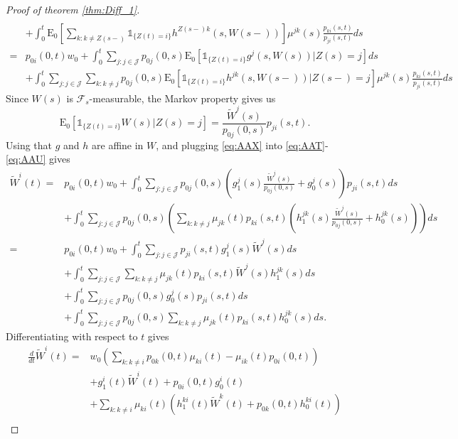 \documentclass[12pt]{article}
\newcommand{\E}{\text{E}}
\newcommand{\indic}[1]{\mathds{1}_{ \{ #1 \} }}
\theoremstyle{my_thm}
\begin{document}
\begin{proof}[Proof of theorem \ref{thm:Diff_1}]
\begin{align}
\\
&+
\nonumber \int_0^t \E_0 \left[ \sum_{k:k \neq Z(s-)}  \indic{Z(t)=i} h^{Z(s-)k}(s,W(s-))\right] \mu^{jk}(s) \frac{p_{ki}(s,t)}{p_{ji}(s,t)}  ds
\\
=&
p_{0i}(0,t)w_0+
 \int_0^t \sum_{j:j \in \mathcal{J}} p_{0j}(0,s) \E_0 \left[ \indic{Z(t)=i} g^{j}(s,W(s))|Z(s)=j \right] ds \label{eq:AAT}
\\
&+
 \int_0^t  \sum_{j:j \in \mathcal{J}}  \sum_{k:k \neq j} p_{0j}(0,s) \E_0 \left[ \indic{Z(t)=i} h^{jk}(s,W(s-)) | Z(s-)=j \right] \mu^{jk}(s) \frac{p_{ki}(s,t)}{p_{ji}(s,t)}   ds \label{eq:AAU}
\end{align}
Since $W(s)$ is $\mathcal{F}_s$-measurable, the Markov property gives us
\begin{equation}
\E_0[\indic{Z(t)=i}W(s)|Z(s)=j]=\frac{\tilde{W}^j(s)}{p_{0j}(0,s)}p_{ji}(s,t). \label{eq:AAX}
\end{equation}
Using that $g$ and $h$ are affine in $W$, and plugging \eqref{eq:AAX} into \eqref{eq:AAT}-\eqref{eq:AAU} gives
\begin{align*}
\tilde{W}^i(t)=&p_{0i}(0,t)w_0+
\int_0^t \sum_{j:j \in \mathcal{J}} p_{0j}(0,s)\left(  g_1^j(s)\frac{\tilde{W}^j(s)}{p_{0j}(0,s)}+g^j_0(s)\right)p_{ji}(s,t) ds
\\
&+
\int_0^t \sum_{j:j \in \mathcal{J}} p_{0j}(0,s)  \left( \sum_{k:k \neq j}  \mu_{jk}(t)p_{ki}(s,t) \left(  h_1^{jk}(s) \frac{\tilde{W}^j(s)}{p_{0j}(0,s)} +h_0^{jk}(s)  \right) \right) ds
 \\
=&p_{0i}(0,t)w_0+
\int_0^t \sum_{j:j \in \mathcal{J}} p_{ji}(s,t) g_1^j(s) \tilde{W}^j(s) ds
\\
&+
\int_0^t \sum_{j:j \in \mathcal{J}} \sum_{k:k \neq j}  \mu_{jk}(t) p_{ki}(s,t) \tilde{W}^j(s) h^{jk}_1(s)  ds
\\
&+
\int_0^t \sum_{j:j \in \mathcal{J}} p_{0j}(0,s)g_0^j(s)p_{ji}(s,t) ds
\\
&+
\int_0^t \sum_{j:j \in \mathcal{J}} p_{0j}(0,s)  \sum_{k:k \neq j}  \mu_{jk}(t) p_{ki}(s,t)h^{jk}_0(s) ds.
\end{align*}
Differentiating with respect to $t$ gives
\begin{align*}
\frac{d}{dt}\tilde{W}^i(t)=&
w_0
\left(\sum_{k:k \neq i} p_{0k}(0,t)\mu_{ki}(t) - \mu_{ik}(t)p_{0i}(0,t)\right)
\\
&+
 g_1^i(t) \tilde{W}^i(t) +p_{0i}(0,t)g^i_0(t)\\
&+
\sum_{k:k \neq i} \mu_{ki}(t) \left(  h_1^{ki}(t) \tilde{W}^k(t) + p_{0k}(0,t)h^{ki}_0(t) \right)
\\

\end{align*}
\end{proof}
\end{document}

